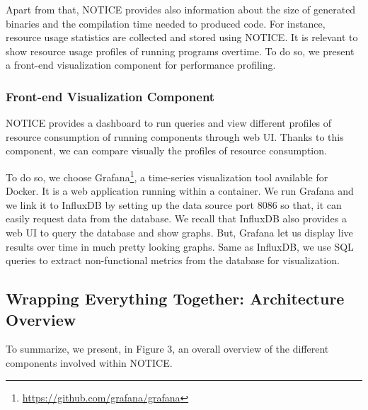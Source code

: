 Apart from that, NOTICE provides also information about the size of generated binaries and the compilation time needed to produced code.
For instance, resource usage statistics are collected and stored using NOTICE. It is relevant to show resource usage profiles of running programs overtime. To do so, we present a front-end visualization component for performance profiling. 

\subsubsection{Front-end Visualization Component}
NOTICE provides a dashboard to run queries and view different profiles of resource consumption of running components through web UI. 
Thanks to this component, we can compare visually the profiles of resource consumption. 

To do so, we choose Grafana\footnote{\url{https://github.com/grafana/grafana}}, a time-series visualization tool available for Docker. It is a web application running within a container. We run Grafana and we link it to InfluxDB by setting up the data source port 8086 so that, it can easily request data from the database. 
We recall that InfluxDB also provides a web UI to query the database and show graphs. But, Grafana let us display live results over time in much pretty looking graphs. Same as InfluxDB, we use SQL queries to extract non-functional metrics from the database for visualization.

\subsection{Wrapping Everything Together: Architecture Overview}
To summarize, we present, in Figure 3, an overall overview of the different components involved within NOTICE.

